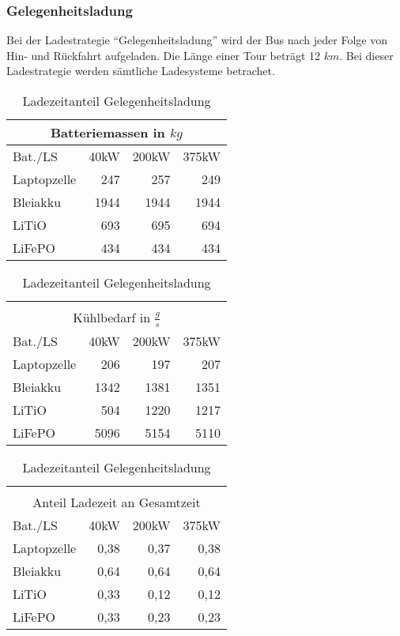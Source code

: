 \subsubsection{Gelegenheitsladung}
Bei der Ladestrategie "`Gelegenheitsladung"' wird der Bus nach jeder Folge von Hin- und Rückfahrt aufgeladen. Die Länge einer Tour beträgt 12 $km$. Bei dieser Ladestrategie werden sämtliche Ladesysteme betrachet.

\begin{table}[h!]
	\begin{minipage}{0.45\textwidth}
		\centering
		\begin{tabular}{lrrr}
			\multicolumn{4}{c}{Batteriemassen in $kg$} \\ \toprule
			Bat./LS     & 40kW & 200kW &         375kW \\ \midrule
			Laptopzelle &  247 &   257 &           249 \\
			Bleiakku    & 1944 &  1944 &          1944 \\
			LiTiO       &  693 &   695 &           694 \\
			LiFePO      &  434 &   434 &           434 \\ \bottomrule
		\end{tabular} 
		\caption{Batteriemassen Gelegnheitsladung}
		
		\begin{tabular}{lrrr}
			 & & & \\
			\multicolumn{4}{c}{Kühlbedarf in $\frac{g}{s}$} \\ \toprule
			Bat./LS     & 40kW & 200kW &              375kW \\ \midrule
			Laptopzelle &  206 &   197 &                207 \\
			Bleiakku    & 1342 &  1381 &               1351 \\
			LiTiO       &  504 &  1220 &               1217 \\
			LiFePO      & 5096 &  5154 &               5110 \\ \bottomrule
		\end{tabular} 
		\caption{Kühlungsbedarf Gelegenheitsladung}
		
		\begin{tabular}{lrrr}
			 & & & \\
			\multicolumn{4}{c}{Anteil Ladezeit an Gesamtzeit} \\ \toprule
			Bat./LS     & 40kW & 200kW &                375kW \\ \midrule
			Laptopzelle & 0,38 &  0,37 &                 0,38 \\
			Bleiakku    & 0,64 &  0,64 &                 0,64 \\
			LiTiO       & 0,33 &  0,12 &                 0,12 \\
			LiFePO      & 0,33 &  0,23 &                 0,23 \\ \bottomrule
		\end{tabular} 
		\caption{Ladezeitanteil Gelegenheitsladung}
		

\end{minipage}
\end{table}
